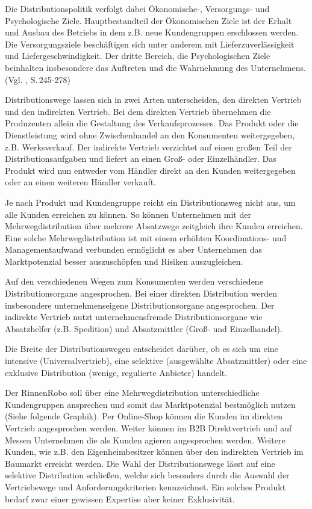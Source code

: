         \noindent
        Die Distributionspolitik verfolgt dabei Ökonomische-, Versorgungs- und Psychologische Ziele. Hauptbestandteil der
        Ökonomischen Ziele ist der Erhalt und Ausbau des Betriebs in dem z.B. neue Kundengruppen erschlossen werden. Die
        Versorgungsziele beschäftigen sich unter anderem mit Lieferzuverlässigkeit und Liefergeschwindigkeit. Der dritte
        Bereich, die Psychologischen Ziele beinhalten insbesondere das Auftreten und die Wahrnehmung des Unternehmens.
        (Vgl. \cite{Bruhn2014}, S.\,245-278)
    
        \noindent
        Distributionswege lassen sich in zwei Arten unterscheiden, den direkten Vertrieb und den indirekten Vertrieb. Bei
        dem direkten Vertrieb übernehmen die Produzenten allein die Gestaltung des Verkaufsprozesses. Das Produkt oder die
        Dienstleistung wird ohne Zwischenhandel an den Konsumenten weitergegeben, z.B. Werksverkauf. Der indirekte Vertrieb
        verzichtet auf einen großen Teil der Distributionsaufgaben und liefert an einen Groß- oder Einzelhändler. Das
        Produkt wird nun entweder vom Händler direkt an den Kunden weitergegeben oder an einen weiteren Händler verkauft.
    
        \noindent
        Je nach Produkt und Kundengruppe reicht ein Distributionsweg nicht aus, um alle Kunden erreichen zu können. So
        können Unternehmen mit der Mehrwegdistribution über mehrere Absatzwege zeitgleich ihre Kunden erreichen. Eine solche
        Mehrwegdistribution ist mit einem erhöhten Koordinations- und Managementaufwand verbunden ermöglicht es aber
        Unternehmen das Marktpotenzial besser auszuschöpfen und Risiken auszugleichen.
    
        \noindent
        Auf den verschiedenen Wegen zum Konsumenten werden verschiedene Distributionsorgane angesprochen. Bei einer direkten
        Distribution werden insbesondere unternehmenseigene Distributionsorgane angesprochen. Der indirekte Vertrieb nutzt
        unternehmensfremde Distributionsorgane wie Absatzhelfer (z.B. Spedition) und Absatzmittler (Groß- und Einzelhandel).
    
        \noindent
        Die Breite der Distributionswegen entscheidet darüber, ob es sich um eine intensive (Universalvertrieb), eine
        selektive (ausgewählte Absatzmittler) oder eine exklusive Distribution (wenige, regulierte Anbieter) handelt.
    
        \noindent
        Der RinnenRobo soll über eine Mehrwegdistribution unterschiedliche Kundengruppen ansprechen und somit das
        Marktpotenzial bestmöglich nutzen (Siehe folgende Graphik). Per Online-Shop können die Kunden im direkten Vertrieb
        angesprochen werden. Weiter können im B2B Direktvertrieb und auf Messen Unternehmen die als Kunden agieren
        angesprochen werden. Weitere Kunden, wie z.B. den Eigenheimbesitzer können über den indirekten Vertrieb im Baumarkt
        erreicht werden. Die Wahl der Distributionswege lässt auf eine selektive Distribution schließen, welche sich
        besonders durch die Auswahl der Vertriebswege und Anforderungskriterien kennzeichnet. Ein solches Produkt bedarf
        zwar einer gewissen Expertise aber keiner Exklusivität.
    
